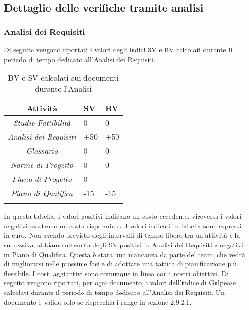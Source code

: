 \subsection{Dettaglio delle verifiche tramite analisi}
\subsubsection{Analisi dei Requisiti}
Di seguito vengono riportati i valori degli indici SV e BV calcolati durante il periodo di tempo dedicato all'Analisi dei Requisiti.
\begin{longtable}{|c|p{3cm}|p{3cm}|}
\toprule
\textbf{Attività} & \textbf{SV} & \textbf{BV} \\


\midrule
\emph{Studio Fattibilità} & 0 & 0 \\
\midrule
\emph{Analisi dei Requisiti} & +50 & +50\\
\midrule
\emph{Glossario} & 0  & 0\\
\midrule
\emph{Norme di Progetto} & 0 & 0\\
\midrule
\emph{Piano di Progetto} & 0 & \\
\midrule
\emph{Piano di Qualifica} & -15 & -15\\
\bottomrule
\caption{BV e SV calcolati sui documenti durante l'Analisi}
\label{tab:changelog}
\end{longtable}
In questa tabella, i valori positivi indicano un costo eccedente, viceversa i valori negativi mostrano un costo risparmiato.
I valori indicati in tabella sono espressi in euro.
Non avendo previsto degli intervalli di tempo libero tra un'attività e la successiva, abbiamo ottenuto degli SV positivi in Analisi dei Requisiti e negativi in Piano di Qualifica.
Questa è stata una mancanza da parte del team, che vedrà di migliorarsi nelle prossime fasi e di adottare una tattica di pianificazione più flessibile.
I costi aggiuntivi sono comunque in linea con i nostri obiettivi.
Di seguito vengono riportati, per ogni documento, i valori dell'indice di Gulpease calcolati durante il periodo di tempo dedicato all'Analisi dei Requisiti. Un documento è valido solo se rispecchia i range in sezione 2.9.2.1.
